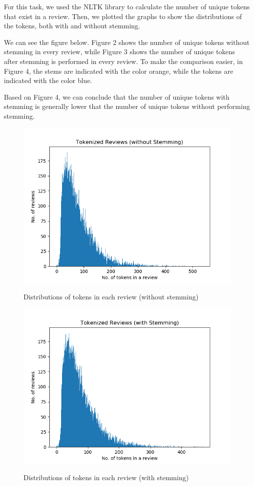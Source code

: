 For this task, we used the NLTK library to calculate the number of unique tokens that exist in a review. Then, we plotted the graphs to show the distributions of the tokens, both with and without stemming.

We can see the figure below. Figure 2 shows the number of unique tokens without stemming in every review, while Figure 3 shows the number of unique tokens after stemming is performed in every review. To make the comparison easier, in Figure 4, the stems are indicated with the color orange, while the tokens are indicated with the color blue.

Based on Figure 4, we can conclude that the number of unique tokens with stemming is generally lower that the number of unique tokens without performing stemming.

\begin{figure}
    \caption{Distributions of tokens in each review (without stemming)}
    \includegraphics[scale=0.5]{figures/token_review.png}
    \label{fig:tokenized_review}
\end{figure}

\begin{figure}
    \caption{Distributions of tokens in each review (with stemming)}
    \includegraphics[scale=0.5]{figures/stem_review.png}
    \label{fig:stemmed_token_review}
\end{figure}

